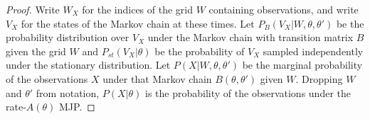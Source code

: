 \begin{proof}
Write $W_X$ for the indices of the grid $W$ containing observations, and write $V_X$
for the states of the Markov chain at these times.
Let $P_B(V_X | W, \theta, \theta')$ be the probability distribution over
$V_X$ under the Markov chain with transition matrix $B$ given the grid 
$W$ and $P_{st}(V_X|\theta)$ be the probability of $V_X$ sampled
independently under the stationary distribution. 
Let $P(X | W, \theta, \theta')$ be the marginal probability of the 
observations $X$ under that Markov chain $B(\theta,\theta')$ given $W$. Dropping $W$ and 
$\theta'$ from notation, $P(X|\theta)$
is the probability of the observations under the rate-$A(\theta)$ MJP.


\end{proof}
